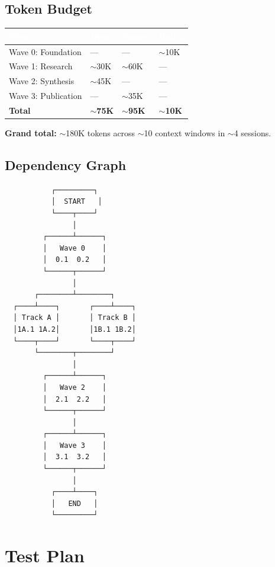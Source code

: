 \documentclass[11pt,letterpaper]{article}
\newcommand{\tableheader}[1]{\textbf{\sffamily\textcolor{white}{#1}}}
\begin{document}
\subsection{Token Budget}

\begin{center}
\begin{tabularx}{\textwidth}{L{4cm}C{2cm}C{2cm}C{2cm}}
\toprule
{}
\tableheader{Wave} & \tableheader{Opus} & \tableheader{Sonnet} & \tableheader{Haiku} \\
\midrule
Wave 0: Foundation & --- & --- & $\sim$10K \\
Wave 1: Research & $\sim$30K & $\sim$60K & --- \\
Wave 2: Synthesis & $\sim$45K & --- & --- \\
Wave 3: Publication & --- & $\sim$35K & --- \\
\midrule
\textbf{Total} & \textbf{$\sim$75K} & \textbf{$\sim$95K} & \textbf{$\sim$10K} \\
\bottomrule
\end{tabularx}
\end{center}

\textbf{Grand total:} $\sim$180K tokens across $\sim$10 context windows in $\sim$4 sessions.

\subsection{Dependency Graph}

\begin{asciibox}
\begin{verbatim}
           ┌─────────┐
           │  START   │
           └────┬────┘
                │
         ┌──────┴──────┐
         │   Wave 0    │
         │  0.1  0.2   │
         └──────┬──────┘
                │
       ┌────────┴────────┐
  ┌────┴────┐       ┌────┴────┐
  │ Track A │       │ Track B │
  │1A.1 1A.2│       │1B.1 1B.2│
  └────┬────┘       └────┬────┘
       └────────┬────────┘
                │
         ┌──────┴──────┐
         │   Wave 2    │
         │  2.1  2.2   │
         └──────┬──────┘
                │
         ┌──────┴──────┐
         │   Wave 3    │
         │  3.1  3.2   │
         └──────┬──────┘
                │
           ┌────┴────┐
           │   END   │
           └─────────┘
\end{verbatim}
\end{asciibox}

\section{Test Plan}
\end{document}
